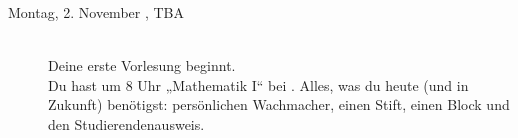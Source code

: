 \begin{description}
    \else
        \item[Montag, 2. November \YEAR, TBA]\ \\
            Deine erste Vorlesung beginnt. \\
            Du hast um 8 Uhr „Mathematik I“ bei \Matheprof.
            Alles, was du heute (und in Zukunft) benötigst: persönlichen Wachmacher, einen Stift, einen Block und den Studierendenausweis.

    \fi
\fi






\end{description}
